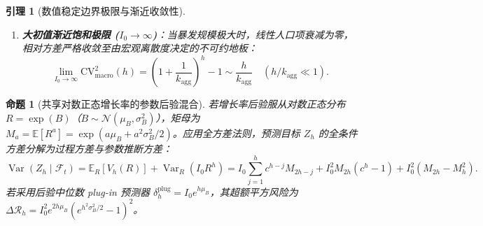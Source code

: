 \documentclass[11pt,a4paper]{article}
\theoremstyle{plain}
\newtheorem{proposition}{命题}
\newtheorem{lemma}{引理}
\theoremstyle{definition}
\begin{document}
\begin{lemma}[数值稳定边界极限与渐近收敛性]
\begin{enumerate}
\item \textbf{大初值渐近饱和极限 ($I_0 \to \infty$)}：当暴发规模极大时，线性人口项衰减为零，相对方差严格收敛至由宏观离散度决定的不可约地板：
\begin{equation}
\lim_{I_0 \to \infty} \text{CV}^2_{\text{macro}}(h) = \left(1 + \frac{1}{k_{\text{agg}}}\right)^h - 1 \sim \frac{h}{k_{\text{agg}}} \quad (h/k_{\text{agg}} \ll 1).
\end{equation}
\end{enumerate}
\end{lemma}


\begin{proposition}[共享对数正态增长率的参数后验混合]\label{prop:posterior_mixture}
若增长率后验服从对数正态分布 $R = \exp(B)$（$B \sim \mathcal{N}(\mu_B, \sigma_B^2)$），矩母为 $M_a = \mathbb{E}[R^a] = \exp(a\mu_B + a^2\sigma_B^2/2)$。应用全方差法则，预测目标 $Z_h$ 的全条件方差分解为过程方差与参数推断方差：
\begin{equation}
\operatorname{Var}(Z_h \mid \mathcal{F}_t) = \mathbb{E}_R[V_h(R)] + \operatorname{Var}_R(I_0 R^h) = I_0 \sum_{j=1}^h c^{h-j} M_{2h-j} + I_0^2 M_{2h}(c^h - 1) + I_0^2(M_{2h} - M_h^2). \label{eq:mixture_full_var}
\end{equation}
若采用后验中位数 plug-in 预测器 $\delta_h^{\text{plug}} = I_0 e^{h\mu_B}$，其超额平方风险为 $\Delta \mathcal{R}_h = I_0^2 e^{2h\mu_B}(e^{h^2\sigma_B^2/2} - 1)^2$。
\end{proposition}

\end{document}
